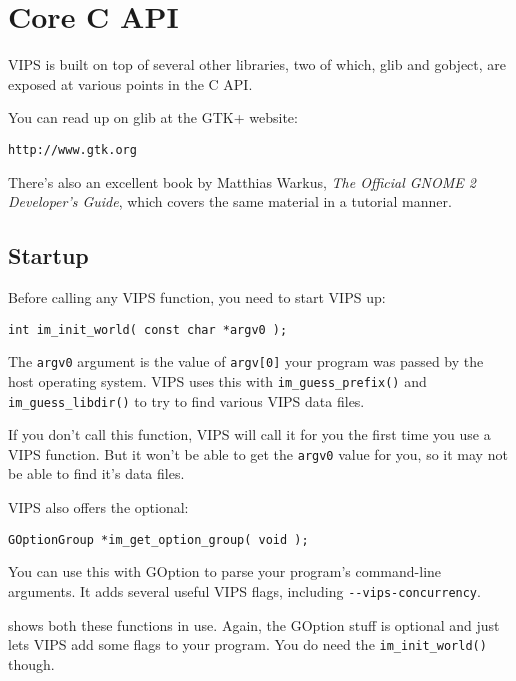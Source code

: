 \section{Core C API}

VIPS is built on top of several other libraries, two of which, glib and
gobject, are exposed at various points in the C API.

You can read up on glib at the GTK+ website:

\begin{verbatim}
http://www.gtk.org
\end{verbatim}

There's also an excellent book by Matthias Warkus, \emph{The Official 
GNOME 2 Developer's Guide}, which covers the same material in a tutorial
manner.

\subsection{Startup}

Before calling any VIPS function, you need to start VIPS up:

\begin{verbatim}
int im_init_world( const char *argv0 );
\end{verbatim}

The \verb+argv0+ argument is the value of \verb+argv[0]+ your
program was passed by the host operating system. VIPS uses this with
\verb+im_guess_prefix()+ and \verb+im_guess_libdir()+ to try to find various 
VIPS data files.

If you don't call this function, VIPS will call it for you the first time you
use a VIPS function. But it won't be able to get the \verb+argv0+ value for
you, so it may not be able to find it's data files.

VIPS also offers the optional:

\begin{verbatim}
GOptionGroup *im_get_option_group( void );
\end{verbatim}

You can use this with GOption to parse your program's command-line arguments.
It adds several useful VIPS flags, including \verb+--vips-concurrency+.

 shows both these functions in use. Again, the GOption stuff is
optional and just lets VIPS add some flags to your program. You do need the
\verb+im_init_world()+ though.

